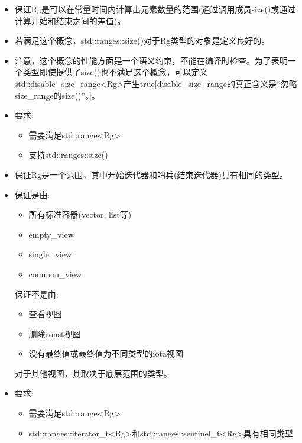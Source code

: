 \begin{itemize}
\item
保证Rg是可以在常量时间内计算出元素数量的范围(通过调用成员size()或通过计算开始和结束之间的差值)。

\item
若满足这个概念，std::ranges::size()对于Rg类型的对象是定义良好的。

\item
注意，这个概念的性能方面是一个语义约束，不能在编译时检查。为了表明一个类型即使提供了size()也不满足这个概念，可以定义std::disable\_size\_range<Rg>产生true[disable\_size\_range的真正含义是“忽略size\_range的size()”。]。

\item
要求:

\begin{itemize}
\item
需要满足std::range<Rg>

\item
支持std::ranges::size()
\end{itemize}
\end{itemize}


\begin{itemize}
\item
保证Rg是一个范围，其中开始迭代器和哨兵(结束迭代器)具有相同的类型。

\item
保证是由:

\begin{itemize}
\item
所有标准容器(vector, list等)

\item
empty\_view

\item
single\_view

\item
common\_view
\end{itemize}

保证不是由:

\begin{itemize}
\item
查看视图

\item
删除const视图

\item
没有最终值或最终值为不同类型的iota视图
\end{itemize}

对于其他视图，其取决于底层范围的类型。

\item
要求:

\begin{itemize}
\item
需要满足std::range<Rg>

\item
std::ranges::iterator\_t<Rg>和std::ranges::sentinel\_t<Rg>具有相同类型
\end{itemize}
\end{itemize}

